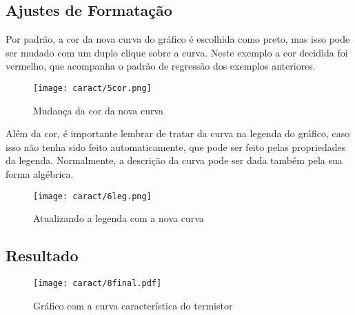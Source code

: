\subsection{Ajustes de Formatação}

    Por padrão, a cor da nova curva do gráfico é escolhida como preto, mas isso pode ser mudado com um duplo clique sobre a curva. Neste exemplo a cor decidida foi vermelho, que acompanha o padrão de regressão dos exemplos anteriores.

    \begin{figure}[htbp]
        \centering
        \texttt{[image: caract/5cor.png]}

        \caption{Mudança da cor da nova curva}
        \label{fig:caract:cor}
    \end{figure}

    Além da cor, é importante lembrar de tratar da curva na legenda do gráfico, caso isso não tenha sido feito automaticamente, que pode ser feito pelas propriedades da legenda. Normalmente, a descrição da curva pode ser dada também pela sua forma algébrica.

    \begin{figure}[htbp]
        \centering
        \texttt{[image: caract/6leg.png]}
        \caption{Atualizando a legenda com a nova curva}
        \label{fig:caract:legenda}
    \end{figure}


\subsection{Resultado}

    \begin{figure}[htbp]
        \centering
        \texttt{[image: caract/8final.pdf]}

        \caption{Gráfico com a curva característica do termistor}
        \label{fig:caract:final}
    \end{figure}

